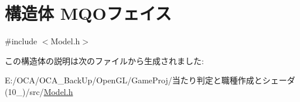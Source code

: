 \hypertarget{struct_m_q_o_xE3_x83_x95_xE3_x82_xA7_xE3_x82_xA4_xE3_x82_xB9}{\section{構造体 M\-Q\-Oフェイス}
\label{struct_m_q_o_xE3_x83_x95_xE3_x82_xA7_xE3_x82_xA4_xE3_x82_xB9}
}


{\ttfamily \#include $<$Model.\-h$>$}



この構造体の説明は次のファイルから生成されました\-:\begin{DoxyCompactItemize}
\item 
E\-:/\-O\-C\-A/\-O\-C\-A\-\_\-\-Back\-Up/\-Open\-G\-L/\-Game\-Proj/当たり判定と職種作成とシェーダ(10\-\_)/src/\hyperlink{_model_8h}{Model.\-h}\end{DoxyCompactItemize}
